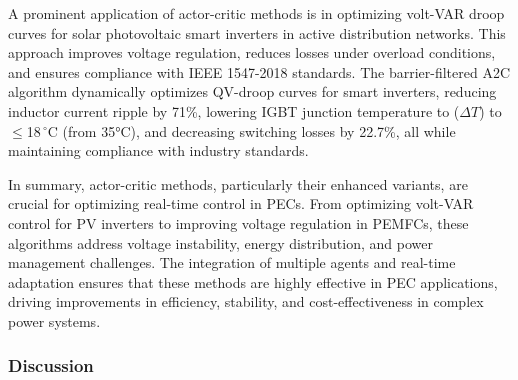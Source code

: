 A prominent application of actor-critic methods is in optimizing volt-VAR droop curves for solar photovoltaic smart inverters in active distribution networks. This approach improves voltage regulation, reduces losses under overload conditions, and ensures compliance with IEEE 1547-2018 standards. The barrier-filtered A2C algorithm dynamically optimizes QV-droop curves for smart inverters, reducing inductor current ripple by 71\%, lowering IGBT junction temperature to ($\Delta T$) to $\leq$18\,$^\circ$C (from 35°C), and decreasing switching losses by 22.7\%, all while maintaining compliance with industry standards.


In summary, actor-critic methods, particularly their enhanced variants, are crucial for optimizing real-time control in PECs. From optimizing volt-VAR control for PV inverters to improving voltage regulation in PEMFCs, these algorithms address voltage instability, energy distribution, and power management challenges. The integration of multiple agents and real-time adaptation ensures that these methods are highly effective in PEC applications, driving improvements in efficiency, stability, and cost-effectiveness in complex power systems.

\subsubsection{Discussion}

